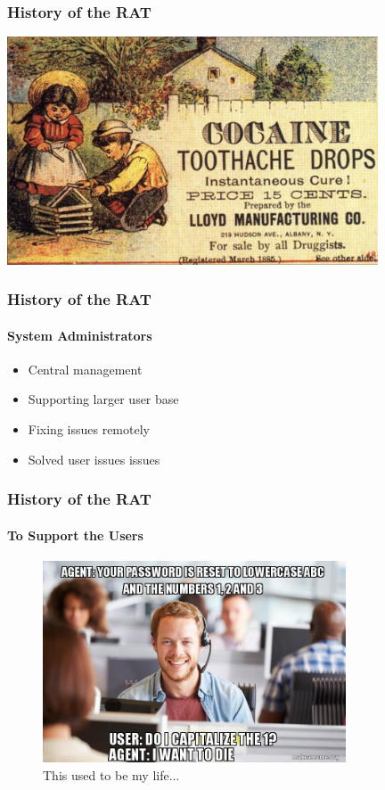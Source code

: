 \documentclass[aspectratio=169]{beamer}
\begin{document}
\begin{frame}
  \frametitle{History of the RAT}
  \begin{center}
    \includegraphics[width=11cm,keepaspectratio]{history}
  \end{center}
\end{frame}

\begin{frame}
  \frametitle{History of the RAT}
  \framesubtitle{System Administrators}
  \begin{itemize}
  \item{Central management}
  \item{Supporting larger user base}
  \item{Fixing issues remotely}
  \item{Solved user issues issues}
  \end{itemize}
\end{frame}

\begin{frame}
  \frametitle{History of the RAT}
  \framesubtitle{To Support the Users}
  \begin{center}
    \begin{figure}
      \includegraphics[width=9cm,keepaspectratio]{user_support}
      \caption{This used to be my life...}
    \end{figure}
  \end{center}
\end{frame}
\end{document}
